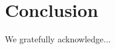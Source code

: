 \documentclass[prb,preprint,letterpaper,noeprint,longbibliography,nodoi,footinbib]{revtex4-1}
\begin{document}


\section{Conclusion}


%
%


\begin{acknowledgments}

We gratefully acknowledge...

\end{acknowledgments}
\end{document}
